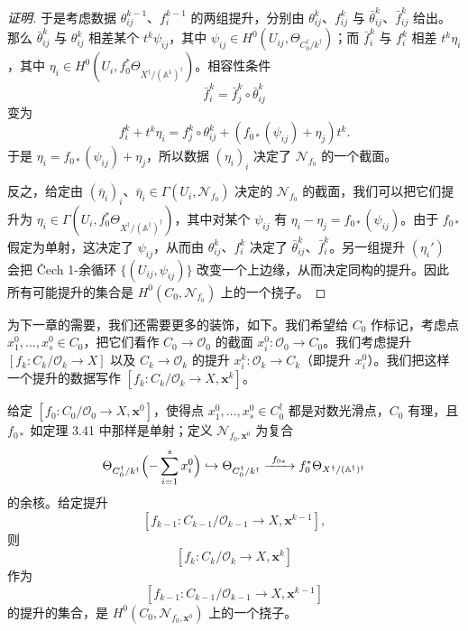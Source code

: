 \begin{proof}[证明]
于是考虑数据 $\theta_{ij}^{k-1}$、$f_i^{k-1}$ 的两组提升，分别由 $\theta_{ij}^{k}$、$f_{ij}^{k}$ 与 $\bar\theta_{ij}^{k}$、$\bar f_{ij}^{k}$ 给出。那么 $\bar\theta_{ij}^{k}$ 与 $\theta_{ij}^{k}$ 相差某个 $t^k\psi_{ij}$，其中 $\psi_{ij}\in H^0(U_{ij},\Theta_{C_0^{\dagger}/k^{\dagger}})$；而 $\bar f_i^{k}$ 与 $f_i^{k}$ 相差 $t^k\eta_i$，其中 $\eta_i\in H^0(U_i,f_0^{*}\Theta_{X^{\dagger}/(\mathbb{A}^1)^{\dagger}})$。相容性条件
\[
  \bar f_i^{k}=\bar f_j^{k}\circ\bar\theta_{ij}^{k}
\]
变为
\[
  f_i^{k}+t^k\eta_i=f_j^{k}\circ\theta_{ij}^{k}+(f_{0*}(\psi_{ij})+\eta_j)t^k.
\]
于是 $\eta_i=f_{0*}(\psi_{ij})+\eta_j$，所以数据 $(\eta_i)_i$ 决定了 $\mathcal{N}_{f_0}$ 的一个截面。

反之，给定由 $(\bar\eta_i)_i$、$\bar\eta_i\in\Gamma(U_i,\mathcal{N}_{f_0})$ 决定的 $\mathcal{N}_{f_0}$ 的截面，我们可以把它们提升为 $\eta_i\in\Gamma(U_i,f_0^{*}\Theta_{X^{\dagger}/(\mathbb{A}^1)^{\dagger}})$，其中对某个 $\psi_{ij}$ 有 $\eta_i-\eta_j=f_{0*}(\psi_{ij})$。由于 $f_{0*}$ 假定为单射，这决定了 $\psi_{ij}$，从而由 $\theta_{ij}^{k}$、$f_i^{k}$ 决定了 $\bar\theta_{ij}^{k}$、$\bar f_i^{k}$。另一组提升 $(\eta_i')$ 会把 Čech 1-余循环 $\{(U_{ij},\psi_{ij})\}$ 改变一个上边缘，从而决定同构的提升。因此所有可能提升的集合是 $H^0(C_0,\mathcal{N}_{f_0})$ 上的一个挠子。
\end{proof}

为下一章的需要，我们还需要更多的装饰，如下。我们希望给 $C_0$ 作标记，考虑点 $x_1^0,\dots,x_s^0\in C_0$，把它们看作 $C_0\to\mathcal{O}_0$ 的截面 $x_i^0:\mathcal{O}_0\to C_0$。我们考虑提升 $[f_k:C_k/\mathcal{O}_k\to X]$ 以及 $C_k\to\mathcal{O}_k$ 的提升 $x_i^k:\mathcal{O}_k\to C_k$（即提升 $x_i^0$）。我们把这样一个提升的数据写作 $[f_k:C_k/\mathcal{O}_k\to X,\mathbf{x}^k]$。

\begin{theorem}
给定 $[f_0:C_0/\mathcal{O}_0\to X,\mathbf{x}^0]$，使得点 $x_1^0,\dots,x_s^0\in C_0^{\dagger}$ 都是对数光滑点，$C_0$ 有理，且 $f_{0*}$ 如定理 3.41 中那样是单射；定义 $\mathcal{N}_{f_0,\mathbf{x}^0}$ 为复合
\[
  \Theta_{C_0^{\dagger}/k^{\dagger}}\Bigl(-\sum_{i=1}^{s}x_i^0\Bigr)
  \hookrightarrow\Theta_{C_0^{\dagger}/k^{\dagger}}
  \xrightarrow{\ f_{0*}\ }f_0^{*}\Theta_{X^{\dagger}/(\mathbb{A}^1)^{\dagger}}
\]
的余核。给定提升
\[
  [f_{k-1}:C_{k-1}/\mathcal{O}_{k-1}\to X,\mathbf{x}^{k-1}],
\]
则
\[
  [f_k:C_k/\mathcal{O}_k\to X,\mathbf{x}^k]
\]
作为
\[
  [f_{k-1}:C_{k-1}/\mathcal{O}_{k-1}\to X,\mathbf{x}^{k-1}]
\]
的提升的集合，是 $H^0(C_0,\mathcal{N}_{f_0,\mathbf{x}^0})$ 上的一个挠子。
\end{theorem}

